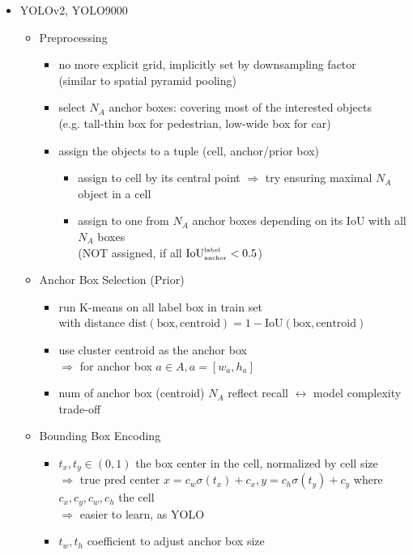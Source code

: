 \begin{itemize}
\item YOLOv2, YOLO9000 \label{DL_CV_Objdet_YOLOv2}
	\begin{itemize}
	\item Preprocessing
		\begin{itemize}
		\item no more explicit grid, implicitly set by downsampling factor \\
		(similar to spatial pyramid pooling)
		\item select $N_A$ anchor boxes: covering most of the interested objects \\
		(e.g. tall-thin box for pedestrian, low-wide box for car)
		\item assign the objects to a tuple (cell, anchor/prior box)
			\begin{itemize}
			\item assign to cell by its central point $\Rightarrow$ try ensuring maximal $N_A$ object in a cell
			\item assign to one from $N_A$ anchor boxes depending on its IoU with all $N_A$ boxes \\
			(NOT assigned, if all $\text{IoU}^\text{\tiny label}_\text{\tiny anchor} < 0.5$)
			\end{itemize}
		\end{itemize}
	\item Anchor Box Selection (Prior)
		\begin{itemize}
		\item run K-means on all label box in train set \\
		with distance $\text{dist}(\text{box}, \text{centroid}) = 1 - \text{IoU}(\text{box}, \text{centroid})$
		\item use cluster centroid as the anchor box \\
		$\Rightarrow$ for anchor box $a\in A, a = [w_a,h_a]$
		\item num of anchor box (centroid) $N_A$ reflect recall $\leftrightarrow$ model complexity trade-off
		\end{itemize}
	\item Bounding Box Encoding
		\begin{itemize}
		\item $t_x,t_y \in (0,1)$ the box center in the cell, normalized by cell size \\
		$\Rightarrow$ true pred center $x=c_w\sigma(t_x) + c_x, y=c_h\sigma(t_y) + c_y$ where $c_x,c_y,c_w,c_h$ the cell \\
		$\Rightarrow$ easier to learn, as YOLO
		\item $t_w,t_h$ coefficient to adjust anchor box size \\

\end{itemize}
\end{itemize}
\end{itemize}
